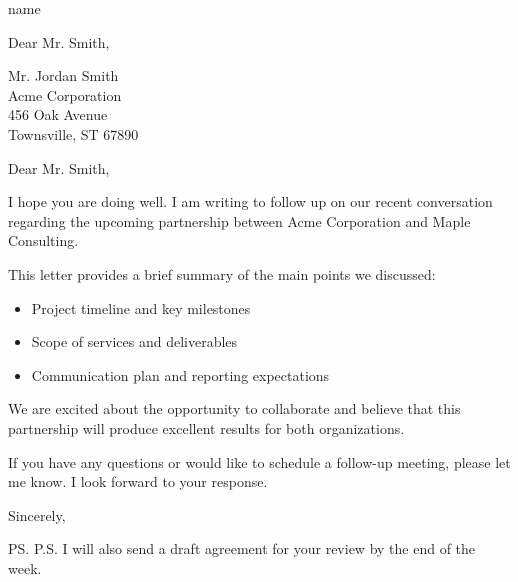 \documentclass[11pt]{letter}
\date{April 7, 2026}
\begin{document}
\begin{letter}{name}

    \opening{Dear Mr. Smith,}

\end{letter}

\begin{letter}{
        Mr. Jordan Smith\\
        Acme Corporation\\
        456 Oak Avenue\\
        Townsville, ST 67890}

    \opening{Dear Mr. Smith,}

    I hope you are doing well. I am writing to follow up on our recent conversation regarding the upcoming partnership between Acme Corporation and Maple Consulting.

    This letter provides a brief summary of the main points we discussed:

    \begin{itemize}
        \item Project timeline and key milestones
        \item Scope of services and deliverables
        \item Communication plan and reporting expectations
    \end{itemize}

    We are excited about the opportunity to collaborate and believe that this partnership will produce excellent results for both organizations.

    If you have any questions or would like to schedule a follow-up meeting, please let me know. I look forward to your response.

    \closing{Sincerely,}

    \ps{P.S. I will also send a draft agreement for your review by the end of the week.}


\end{letter}
\end{document}
